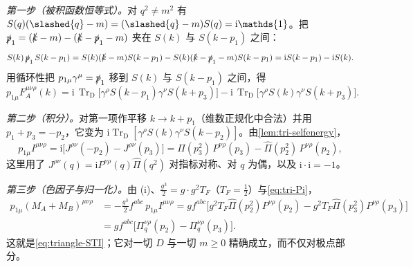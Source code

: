 \documentclass[UTF8,a4paper,11pt,fontset=fandol]{ctexart}
\makeatletter
\let\amsmathbb\mathbb
\renewcommand{\mathbb}[1]{\ifx1#1\mathds{1}\else\amsmathbb{#1}\fi}
\theoremstyle{cplain}
\theoremstyle{cdefinition}
\theoremstyle{cremark}
\renewcommand{\proofname}{证明}
\renewenvironment{proof}[1][\proofname]{\par\pushQED{\qed}\normalfont\topsep6\p@\@plus6\p@\relax
  \trivlist\item[\hskip\labelsep\itshape #1\hspace{0.5em}]\ignorespaces}{\popQED\endtrivlist\@endpefalse}
\numberwithin{equation}{section}
\newcommand{\TrD}{\operatorname{Tr}_{\mathrm{D}}}   %
\newcommand{\sla}[1]{\slashed{#1}}                  %
\newcommand{\ii}{\mathrm{i}}                        %
\makeatother
\begin{document}
\begin{proof}[{\cref{prop:triangle}(iii) 的证明}]
\emph{第一步（被积函数恒等式）。}对 $q^2\neq m^2$ 有 $S(q)(\sla q-m)=(\sla q-m)S(q)=\ii\mathbb 1$。把 $\sla p_1=(\sla k-m)-(\sla k-\sla p_1-m)$ 夹在 $S(k)$ 与 $S(k-p_1)$ 之间：
\begin{equation}\label{eq:tri-ward-integrand}
S(k)\,\sla p_1\,S(k-p_1)=S(k)(\sla k-m)S(k-p_1)-S(k)(\sla k-\sla p_1-m)S(k-p_1)=\ii S(k-p_1)-\ii S(k).
\end{equation}
用循环性把 $p_{1\mu}\gamma^\mu=\sla p_1$ 移到 $S(k)$ 与 $S(k-p_1)$ 之间，得
\begin{equation*}
p_{1\mu}F_A^{\mu\nu\rho}(k)=\ii\,\TrD\bigl[\gamma^\rho S(k-p_1)\gamma^\nu S(k+p_3)\bigr]-\ii\,\TrD\bigl[\gamma^\rho S(k)\gamma^\nu S(k+p_3)\bigr].
\end{equation*}

\emph{第二步（积分）。}对第一项作平移 $k\to k+p_1$（维数正规化中合法）并用 $p_1+p_3=-p_2$，它变为 $\ii\TrD[\gamma^\rho S(k)\gamma^\nu S(k-p_2)]$。由\cref{lem:tri-selfenergy}，
\begin{equation}\label{eq:tri-pI}
p_{1\mu}I^{\mu\nu\rho}=\ii\bigl[J^{\rho\nu}(-p_2)-J^{\rho\nu}(p_3)\bigr]=\hat\Pi(p_3^2)\,P^{\nu\rho}(p_3)-\hat\Pi(p_2^2)\,P^{\nu\rho}(p_2),
\end{equation}
这里用了 $J^{\rho\nu}(q)=\ii P^{\nu\rho}(q)\hat\Pi(q^2)$ 对指标对称、对 $q$ 为偶，以及 $\ii\cdot\ii=-1$。

\emph{第三步（色因子与归一化）。}由 (i)、$\frac{g^3}{2}=g\cdot g^2T_F$（$T_F=\frac12$）与\cref{eq:tri-Pi}，
\begin{equation*}
\begin{aligned}
p_{1\mu}(M_A+M_B)^{\mu\nu\rho}&=-\frac{g^3}{2}f^{abc}\,p_{1\mu}I^{\mu\nu\rho}
=g f^{abc}\bigl[g^2T_F\hat\Pi(p_2^2)P^{\nu\rho}(p_2)-g^2T_F\hat\Pi(p_3^2)P^{\nu\rho}(p_3)\bigr]\\
&=g f^{abc}\bigl[\Pi_q^{\nu\rho}(p_2)-\Pi_q^{\nu\rho}(p_3)\bigr].
\end{aligned}
\end{equation*}
这就是\cref{eq:triangle-STI}；它对一切 $D$ 与一切 $m\ge0$ 精确成立，而不仅对极点部分。
\end{proof}
\end{document}
